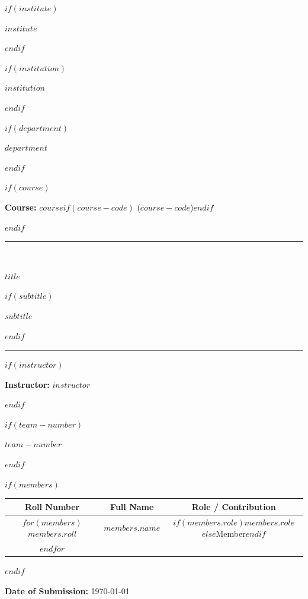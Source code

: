 \documentclass[
$if(fontsize)$
  $fontsize$,
$else$
  11pt,
$endif$
$if(papersize)$
  $papersize$paper,
$else$
  a4paper,
$endif$
$for(classoption)$
  $classoption$$sep$,
$endfor$
]{$if(documentclass)$$documentclass$$else$report$endif$}
\numberwithin{equation}{section}
\numberwithin{table}{section}
\numberwithin{figure}{section}
\begin{document}
\begin{titlepage}
  \centering
  \vspace*{0.5cm}

  $if(institute)$
    {\scshape\LARGE\bfseries $institute$ \par}
    \vspace{0.25cm}
  $endif$

  $if(institution)$
    {\scshape\Large $institution$ \par}
    \vspace{0.3cm}
  $endif$

  $if(department)$
    {\scshape\large $department$ \par}
    \vspace{0.3cm}
  $endif$

  $if(course)$
    {\large\textbf{Course:} $course$$if(course-code)$ ($course-code$)$endif$ \par}
  $endif$

  \vspace{1.8cm}
  \rule{\linewidth}{1.2pt}\\[0.4cm]
  {\huge\bfseries $title$ \par}
  $if(subtitle)$
    \vspace{0.3cm}
    {\Large\itshape $subtitle$ \par}
  $endif$
  \rule{\linewidth}{1.2pt}

  \vspace{1.5cm}

  $if(instructor)$
    {\large\textbf{Instructor:} $instructor$ \par}
    \vspace{0.6cm}
  $endif$

  $if(team-number)$
    {\large\bfseries $team-number$ \par}
    \vspace{0.4cm}
  $endif$

  $if(members)$
    \begin{tabular}{ccc}
      \toprule
      \textbf{Roll Number} & \textbf{Full Name} & \textbf{Role / Contribution} \\
      \midrule
      $for(members)$
      $members.roll$ & $members.name$ & $if(members.role)$$members.role$$else$Member$endif$ \\
      $endfor$
      \bottomrule
    \end{tabular}
    \par
  $endif$

  \vfill

  {\large\textbf{Date of Submission:} \today \par}
  \vspace*{0.5cm}
\end{titlepage}
\end{document}
